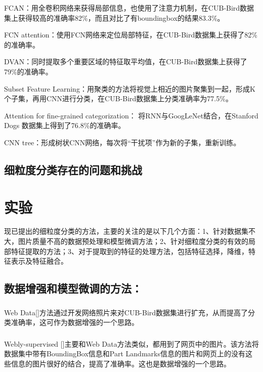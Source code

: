 \documentclass[UTF8]{article}
\begin{document}
FCAN：用全卷积网络来获得局部信息，也使用了注意力机制，在CUB-Bird数据集上获得较高的准确率82\%，而且对比了有boundingbox的结果83.3\%。

FCN attention：使用FCN网络来定位局部特征，在CUB-Bird数据集上获得了82\%的准确率。

DVAN：同时提取多个重要区域的特征取平均值，在CUB-Bird数据集上获得了79\%的准确率。

Subset Feature Learning：用聚类的方法将视觉上相近的图片聚集到一起，形成K个子集，再用CNN进行分类，在CUB-Bird数据集上分类准确率为77.5\%。

Attention for fine-grained categorization： 将RNN与GoogLeNet结合，在Stanford Dogs 数据集上得到了76.8\%的准确率。

CNN tree：形成树状CNN网络，每次将“干扰项”作为新的子集，重新训练。

\subsection{ 细粒度分类存在的问题和挑战}

\section{实验}
现已提出的细粒度分类的方法，主要的关注的是以下几个方面：1、针对数据集不大，图片质量不高的数据预处理和模型微调方法；2、针对细粒度分类的有效的局部特征提取的方法；3、对于提取到的特征的处理方法，包括特征选择，降维，特征表示及特征融合。

\subsection{数据增强和模型微调的方法：}
\subsubsection{{\color{red}{Web Data}}}
Web Data\cite{webdata}[{\color{GREY}{强监督 }}]方法通过开发网络照片来对CUB-Bird数据集进行扩充，从而提高了分类准确率，这可作为数据增强的一个思路。

\subsubsection{{\color{red}{Webly-supervised}}}
Webly-supervised\cite{weblysupervised} [{\color{GREY}{强监督 }}]主要和Web Data方法类似，都用到了网页中的图片。该方法将数据集中带有BoundingBox信息和Part Landmarks信息的图片和网页上的没有这些信息的图片很好的结合，提高了准确率。这也是数据增强的一个思路。
\end{document}
